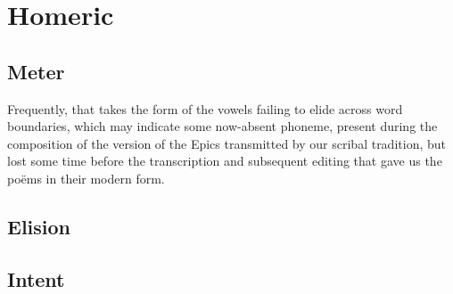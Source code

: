\section{Homeric}\label{sec:Homeric}

\subsection{Meter}\label{subsec:Meter}


Frequently, that takes the form
of the vowels failing to elide across word boundaries, which may indicate some now-absent
phoneme, present during the composition of the version of the Epics transmitted by our
scribal tradition, but lost some time before the transcription and subsequent editing that gave
us the po\"ems in their modern form.

\subsection{Elision}\label{subsec:Elision}
\subsection{Intent}\label{subsec:Intent}